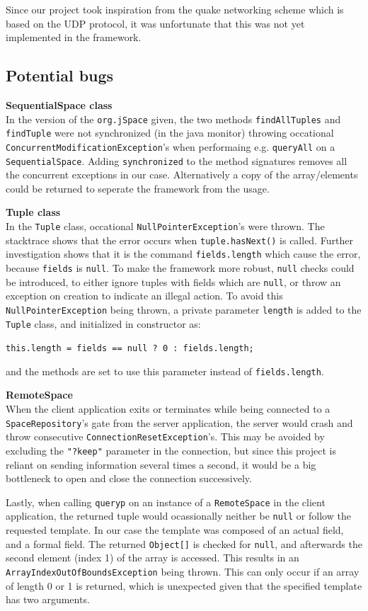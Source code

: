 Since our project took inspiration from the quake networking scheme which is based on the UDP protocol, it was unfortunate that this was not yet implemented in the framework.

\subsection{Potential bugs}
\textbf{SequentialSpace class} \\
In the version of the \texttt{org.jSpace} given, the two methods \texttt{findAllTuples} and \texttt{findTuple} were not synchronized (in the java monitor) throwing occational \texttt{ConcurrentModificationException}'s when performaing e.g. \texttt{queryAll} on a \texttt{SequentialSpace}. Adding \texttt{synchronized} to the method signatures removes all the concurrent exceptions in our case. Alternatively a copy of the array/elements could be returned to seperate the framework from the usage.

\textbf{Tuple class} \\
In the \texttt{Tuple} class, occational \texttt{NullPointerException}'s were thrown. The stacktrace shows that the error occurs when \texttt{tuple.hasNext()} is called. Further investigation shows that it is the command \texttt{fields.length} which cause the error, because \texttt{fields} is \texttt{null}. To make the framework more robust, \texttt{null} checks could be introduced, to either ignore tuples with fields which are \texttt{null}, or throw an exception on creation to indicate an illegal action. To avoid this \texttt{NullPointerException} being thrown, a private parameter \texttt{length} is added to the \texttt{Tuple} class, and initialized in constructor as:
\begin{center}
\texttt{this.length = fields == null ? 0 : fields.length;}
\end{center}
and the methods are set to use this parameter instead of \texttt{fields.length}. 

\textbf{RemoteSpace}\\
When the client application exits or terminates while being connected to a \texttt{SpaceRepository}'s gate from the server application, the server would crash and throw consecutive \texttt{ConnectionResetException}'s. This may be avoided by excluding the \texttt{"?keep"} parameter in the connection, but since this project is reliant on sending information several times a second, it would be a big bottleneck to open and close the connection successively.

Lastly, when calling \texttt{queryp} on an instance of a \texttt{RemoteSpace} in the client application, the returned tuple would ocassionally neither be \texttt{null} or follow the requested template. In our case the template was composed of an actual field, and a formal field. The returned \texttt{Object[]} is checked for \texttt{null}, and afterwards the second element (index 1) of the array is accessed. This results in an \texttt{ArrayIndexOutOfBoundsException} being thrown. This can only occur if an array of length 0 or 1 is returned, which is unexpected given that the specified template has two arguments.
